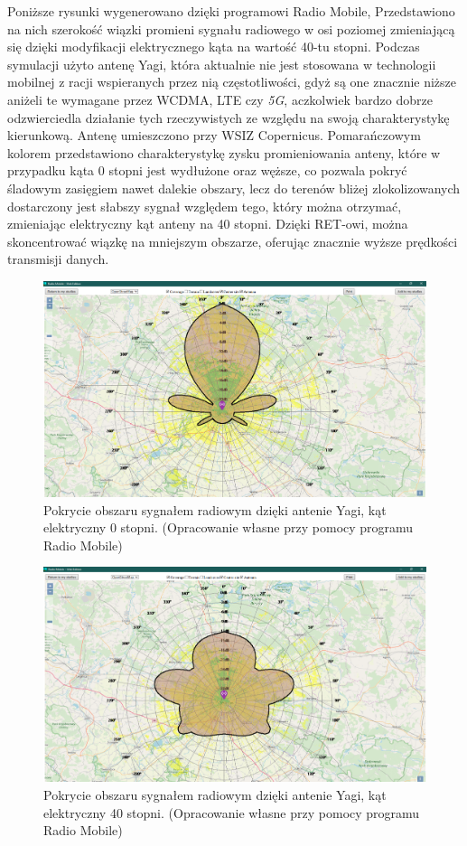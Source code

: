 		Poniższe rysunki wygenerowano dzięki programowi Radio Mobile\cite{RADIO_MOBILE_PAGE_1},
		Przedstawiono na nich szerokość wiązki promieni sygnału radiowego w osi poziomej\cite{BEAMWIDTH_1}
		zmieniającą się dzięki modyfikacji elektrycznego kąta na wartość 40-tu stopni.
		Podczas symulacji użyto antenę Yagi, która aktualnie nie jest stosowana w technologii mobilnej z racji wspieranych
		przez nią częstotliwości, gdyż są one znacznie niższe aniżeli te wymagane przez WCDMA, LTE czy \textit{5G}, 
		aczkolwiek bardzo dobrze odzwierciedla działanie tych rzeczywistych ze względu na swoją charakterystykę kierunkową.
		\newline
		Antenę umieszczono przy WSIZ Copernicus. \newline
		Pomarańczowym kolorem przedstawiono charakterystykę zysku promieniowania anteny, które w przypadku kąta 0 stopni jest wydłużone oraz węższe,
		co pozwala pokryć śladowym zasięgiem nawet dalekie obszary, lecz do terenów bliżej zlokolizowanych dostarczony
		jest słabszy sygnał względem tego, który można otrzymać, zmieniając elektryczny kąt anteny na 40 stopni.
		Dzięki RET-owi, można skoncentrować wiązkę na mniejszym obszarze, oferując znacznie wyższe prędkości transmisji danych.

		\begin{figure}[h!]
			\centering
			\includegraphics[scale=0.5]{Obrazki/Antenna_Yagi_Angle_0.png}
			\caption{Pokrycie obszaru sygnałem radiowym dzięki antenie Yagi, kąt elektryczny 0 stopni.
				\newline(Opracowanie własne przy pomocy programu Radio Mobile)}
		\end{figure}

		\begin{figure}[h!]
			\centering
			\includegraphics[scale=0.5]{Obrazki/Antenna_Yagi_Angle_40.png}
			\caption{Pokrycie obszaru sygnałem radiowym dzięki antenie Yagi, kąt elektryczny 40 stopni.
				\newline(Opracowanie własne przy pomocy programu Radio Mobile)}
		\end{figure}
